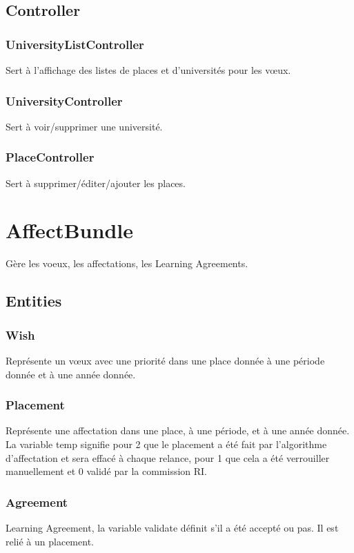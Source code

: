 \subsection{Controller}
\subsubsection{UniversityListController}
Sert à l'affichage des listes de places et d'universités pour les vœux.

\subsubsection{UniversityController}
Sert à voir/supprimer une université. 

\subsubsection{PlaceController}
Sert à supprimer/éditer/ajouter les places.


\section{AffectBundle}
Gère les voeux, les affectations, les Learning Agreements.
\subsection{Entities}
\subsubsection{Wish}
Représente un vœux avec une priorité dans une place donnée à une période donnée et à une année donnée.

\subsubsection{Placement}
Représente une affectation dans une place, à une période, et à une année donnée. La variable temp signifie pour 2 que le placement a été fait par l'algorithme d'affectation et sera effacé à chaque relance, pour 1 que cela a été verrouiller manuellement et 0 validé par la commission RI.

\subsubsection{Agreement}
Learning Agreement, la variable validate définit s'il a été accepté ou pas. Il est relié à un placement.

